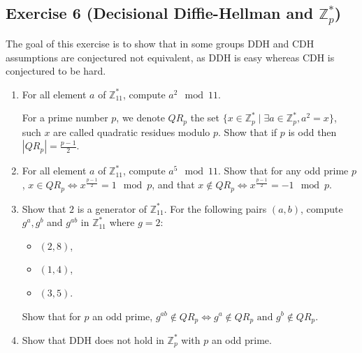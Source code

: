 \subsection{Exercise 6 (Decisional Diffie-Hellman and \texorpdfstring{$\mathbb{Z}_p^\ast$}{Zp*})}
\label{subsec:4.6}
The goal of this exercise is to show that in some groups DDH and CDH assumptions are conjectured not equivalent, as DDH is easy whereas CDH is conjectured to be hard.

\begin{enumerate}
	\item For all element $a$ of $\mathbb{Z}_{11}^*$, compute $a^2 \mod 11$.
	
	For a prime number $p$, we denote $QR_p$ the set $\{x \in \mathbb{Z}_{p}^* \; | \; \exists a\in \mathbb{Z}_{p}^*, a^2=x\}$, such $x$ are called quadratic residues modulo $p$. Show that if $p$ is odd then $|QR_p|=\frac{p-1}{2}$.
	
		\item For all element $a$ of $\mathbb{Z}_{11}^*$, compute $a^5 \mod 11$. Show that for any odd prime $p$, $x \in QR_p \Leftrightarrow x^{\frac{p-1}{2}}= 1 \mod p$, and that $x \not \in QR_p \Leftrightarrow x^{\frac{p-1}{2}}= -1 \mod p$.
	
	\item Show that $2$ is a generator of $\mathbb{Z}_{11}^*$. For the following pairs $(a,b)$, compute $g^a, g^b$ and $g^{ab}$ in $\mathbb{Z}_{11}^*$ where $g=2$:
	\begin{itemize}
		\item $(2,8)$,
		\item $(1,4)$,
		\item $(3,5)$.
	\end{itemize}
    Show that for $p$ an odd prime, $g^{ab} \not \in QR_p \Leftrightarrow g^a \not \in QR_p \text{ and } g^b \not \in QR_p$.
	
	\item Show that DDH does not hold in $\mathbb{Z}_{p}^*$ with $p$ an odd prime.
\end{enumerate}
